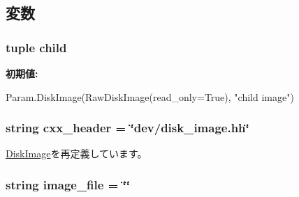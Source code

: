 \subsection{変数}
\hypertarget{classDiskImage_1_1CowDiskImage_a74580d02ef7af2ae9bcc43f9032eb7fb}{
\subsubsection[{child}]{\setlength{\rightskip}{0pt plus 5cm}tuple {\bf child}}}
\label{classDiskImage_1_1CowDiskImage_a74580d02ef7af2ae9bcc43f9032eb7fb}
{\bfseries 初期値:}
\begin{DoxyCode}
Param.DiskImage(RawDiskImage(read_only=True),
                            "child image")
\end{DoxyCode}
\hypertarget{classDiskImage_1_1CowDiskImage_a17da7064bc5c518791f0c891eff05fda}{
\subsubsection[{cxx\_\-header}]{\setlength{\rightskip}{0pt plus 5cm}string {\bf cxx\_\-header} = \char`\"{}dev/disk\_\-image.hh\char`\"{}}}
\label{classDiskImage_1_1CowDiskImage_a17da7064bc5c518791f0c891eff05fda}


\hyperlink{classDiskImage_1_1DiskImage_a17da7064bc5c518791f0c891eff05fda}{DiskImage}を再定義しています。\hypertarget{classDiskImage_1_1CowDiskImage_a0ee2b1c488c3337173db75b5d28a1f63}{
\subsubsection[{image\_\-file}]{\setlength{\rightskip}{0pt plus 5cm}string {\bf image\_\-file} = \char`\"{}\char`\"{}}}
\label{classDiskImage_1_1CowDiskImage_a0ee2b1c488c3337173db75b5d28a1f63}


